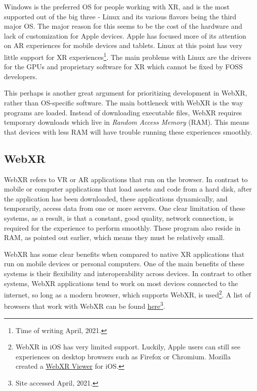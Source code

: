 Windows is the preferred OS for people working with XR, and is the most supported out of the big three - Linux and its various flavors being the third major OS. The major reason for this seems to be the cost of the hardware and lack of customization for Apple devices. Apple has focused more of its attention on AR experiences for mobile devices and tablets. Linux at this point has very little support for XR experiences\footnote{Time of writing April, 2021.}. The main problems with Linux are the drivers for the GPUs and proprietary software for XR which cannot be fixed by FOSS developers. 

This perhaps is another great argument for prioritizing development in WebXR, rather than OS-specific software. The main bottleneck with WebXR is the way programs are loaded. Instead of downloading executable files, WebXR requires temporary downloads which live in \textit{Random Access Memory} (RAM). This means that devices with less RAM will have trouble running these experiences smoothly. 



\subsection{WebXR}

WebXR refers to VR or AR applications that run on the browser. In contrast to mobile or computer applications that load assets and code from a hard disk, after the application has been downloaded, these applications dynamically, and temporarily, access data from one or more servers. One clear limitation of these systems, as a result, is that a constant, good quality, network connection, is required for the experience to perform smoothly. These program also reside in RAM, as pointed out earlier, which means they must be relatively small. 

WebXR has some clear benefits when compared to native XR applications that run on mobile devices or personal computers. One of the main benefits of these systems is their flexibility and interoperability across devices. In contrast to other systems, WebXR applications tend to work on most devices connected to the internet, so long as a modern browser, which supports WebXR, is used\footnote{WebXR in iOS has very limited support. Luckily, Apple users can still see experiences on desktop browsers such as Firefox or Chromium. Mozilla created a \href{https://webxr-ios.webxrexperiments.com/}{WebXR Viewer} for iOS.}. A list of browsers that work with WebXR can be found \href{https://webvr.rocks/}{here}\footnote{Site accessed April, 2021.}. 


